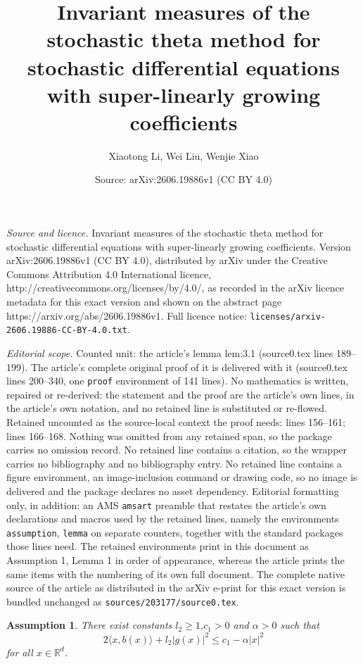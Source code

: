 \documentclass[10pt,a4paper]{amsart}
\title{Invariant measures of the stochastic theta method for stochastic differential equations with super-linearly growing coefficients}
\author{Xiaotong Li, Wei Liu, Wenjie Xiao}
\date{Source: arXiv:2606.19886v1 (CC BY 4.0)}
\newtheorem{assumption}{Assumption}
\begin{document}
\maketitle

\noindent\emph{Source and licence.} Invariant measures of the stochastic theta method for stochastic differential equations with super-linearly growing coefficients. Version arXiv:2606.19886v1 (CC BY 4.0), distributed by arXiv under the Creative Commons Attribution 4.0 International licence, http://creativecommons.org/licenses/by/4.0/, as recorded in the arXiv licence metadata for this exact version and shown on the abstract page https://arxiv.org/abs/2606.19886v1. Full licence notice: \texttt{licenses/arxiv-2606.19886-CC-BY-4.0.txt}.\par\smallskip

\noindent\textit{Editorial scope.} Counted unit: the article's lemma lem:3.1 (source0.tex lines 189--199). The article's complete original proof of it is delivered with it (source0.tex lines 200--340, one \texttt{proof} environment of 141 lines). No mathematics is written, repaired or re-derived: the statement and the proof are the article's own lines, in the article's own notation, and no retained line is substituted or re-flowed.  Retained uncounted as the source-local context the proof needs: lines 156--161; lines 166--168.  Nothing was omitted from any retained span, so the package carries no omission record.  No retained line contains a citation, so the wrapper carries no bibliography and no bibliography entry.  No retained line contains a figure environment, an image-inclusion command or drawing code, so no image is delivered and the package declares no asset dependency.  Editorial formatting only, in addition: an AMS \texttt{amsart} preamble that restates the article's own declarations and macros used by the retained lines, namely the environments \texttt{assumption}, \texttt{lemma} on separate counters, together with the standard packages those lines need.  The retained environments print in this document as Assumption 1, Lemma 1 in order of appearance, whereas the article prints the same items with the numbering of its own full document.  The complete native source of the article as distributed in the arXiv e-print for this exact version is bundled unchanged as \texttt{sources/203177/source0.tex}.
\begin{assumption}\label{assum:2.2}
There exist constants $l_2\geq 1$,$c_1 > 0$ and $\alpha > 0$ such that
\[2\langle x, b(x)\rangle + l_2|g(x)|^2 \le c_1 -\alpha|x|^2
\]
for all $x \in \mathbb{R}^d$.
\end{assumption}
\end{document}
